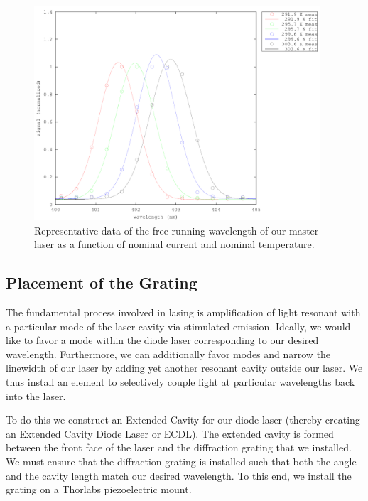 \begin{figure}
\centering
\includegraphics[width=0.95\textwidth]{temperatureFit} 
\caption[Graph of Temperatures and Currents]{\label{3dCurrentandTgraph} Representative data of the free-running wavelength of our master laser as a function of nominal current and nominal temperature.}
\end{figure}

\subsection{Placement of the Grating}



The fundamental process involved in lasing is amplification of light resonant with a particular mode of the laser cavity via stimulated emission. Ideally, we would like to favor a mode within the diode laser corresponding to our desired wavelength. Furthermore, we can additionally favor modes and narrow the linewidth of our laser by adding yet another resonant cavity outside our laser. We thus install an element to selectively couple light at particular wavelengths back into the laser. 

To do this we construct an Extended Cavity for our diode laser (thereby creating an Extended Cavity Diode Laser or ECDL). The extended cavity is formed between the front face of the laser and the diffraction grating that we installed. We must ensure that the diffraction grating is installed such that both the angle and the cavity length match our desired wavelength. To this end, we install the grating on a Thorlabs piezoelectric mount.

